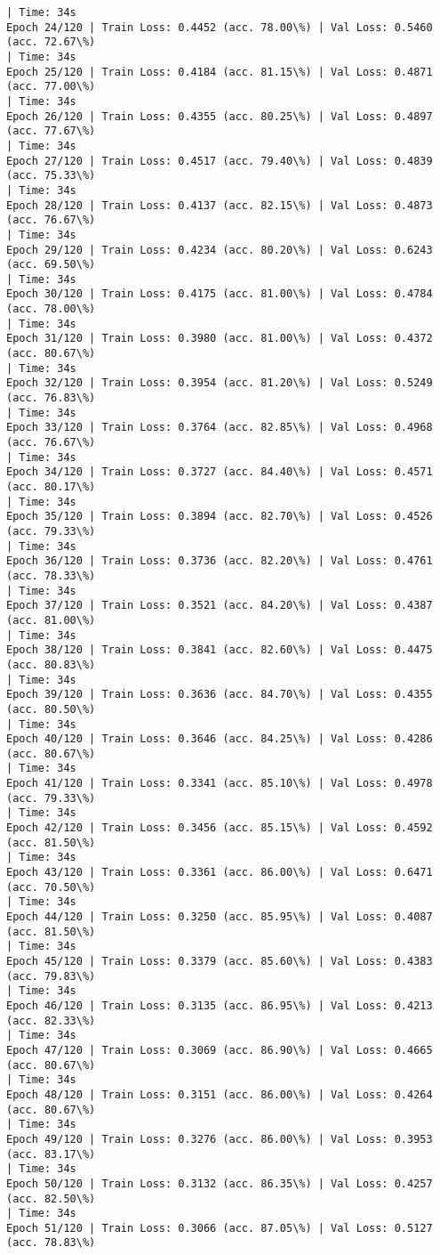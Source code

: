 \documentclass[8pt]{extarticle}
\begin{document}
\begin{Verbatim}[commandchars=\\\{\}]
| Time: 34s
Epoch 24/120 | Train Loss: 0.4452 (acc. 78.00\%) | Val Loss: 0.5460 (acc. 72.67\%)
| Time: 34s
Epoch 25/120 | Train Loss: 0.4184 (acc. 81.15\%) | Val Loss: 0.4871 (acc. 77.00\%)
| Time: 34s
Epoch 26/120 | Train Loss: 0.4355 (acc. 80.25\%) | Val Loss: 0.4897 (acc. 77.67\%)
| Time: 34s
Epoch 27/120 | Train Loss: 0.4517 (acc. 79.40\%) | Val Loss: 0.4839 (acc. 75.33\%)
| Time: 34s
Epoch 28/120 | Train Loss: 0.4137 (acc. 82.15\%) | Val Loss: 0.4873 (acc. 76.67\%)
| Time: 34s
Epoch 29/120 | Train Loss: 0.4234 (acc. 80.20\%) | Val Loss: 0.6243 (acc. 69.50\%)
| Time: 34s
Epoch 30/120 | Train Loss: 0.4175 (acc. 81.00\%) | Val Loss: 0.4784 (acc. 78.00\%)
| Time: 34s
Epoch 31/120 | Train Loss: 0.3980 (acc. 81.00\%) | Val Loss: 0.4372 (acc. 80.67\%)
| Time: 34s
Epoch 32/120 | Train Loss: 0.3954 (acc. 81.20\%) | Val Loss: 0.5249 (acc. 76.83\%)
| Time: 34s
Epoch 33/120 | Train Loss: 0.3764 (acc. 82.85\%) | Val Loss: 0.4968 (acc. 76.67\%)
| Time: 34s
Epoch 34/120 | Train Loss: 0.3727 (acc. 84.40\%) | Val Loss: 0.4571 (acc. 80.17\%)
| Time: 34s
Epoch 35/120 | Train Loss: 0.3894 (acc. 82.70\%) | Val Loss: 0.4526 (acc. 79.33\%)
| Time: 34s
Epoch 36/120 | Train Loss: 0.3736 (acc. 82.20\%) | Val Loss: 0.4761 (acc. 78.33\%)
| Time: 34s
Epoch 37/120 | Train Loss: 0.3521 (acc. 84.20\%) | Val Loss: 0.4387 (acc. 81.00\%)
| Time: 34s
Epoch 38/120 | Train Loss: 0.3841 (acc. 82.60\%) | Val Loss: 0.4475 (acc. 80.83\%)
| Time: 34s
Epoch 39/120 | Train Loss: 0.3636 (acc. 84.70\%) | Val Loss: 0.4355 (acc. 80.50\%)
| Time: 34s
Epoch 40/120 | Train Loss: 0.3646 (acc. 84.25\%) | Val Loss: 0.4286 (acc. 80.67\%)
| Time: 34s
Epoch 41/120 | Train Loss: 0.3341 (acc. 85.10\%) | Val Loss: 0.4978 (acc. 79.33\%)
| Time: 34s
Epoch 42/120 | Train Loss: 0.3456 (acc. 85.15\%) | Val Loss: 0.4592 (acc. 81.50\%)
| Time: 34s
Epoch 43/120 | Train Loss: 0.3361 (acc. 86.00\%) | Val Loss: 0.6471 (acc. 70.50\%)
| Time: 34s
Epoch 44/120 | Train Loss: 0.3250 (acc. 85.95\%) | Val Loss: 0.4087 (acc. 81.50\%)
| Time: 34s
Epoch 45/120 | Train Loss: 0.3379 (acc. 85.60\%) | Val Loss: 0.4383 (acc. 79.83\%)
| Time: 34s
Epoch 46/120 | Train Loss: 0.3135 (acc. 86.95\%) | Val Loss: 0.4213 (acc. 82.33\%)
| Time: 34s
Epoch 47/120 | Train Loss: 0.3069 (acc. 86.90\%) | Val Loss: 0.4665 (acc. 80.67\%)
| Time: 34s
Epoch 48/120 | Train Loss: 0.3151 (acc. 86.00\%) | Val Loss: 0.4264 (acc. 80.67\%)
| Time: 34s
Epoch 49/120 | Train Loss: 0.3276 (acc. 86.00\%) | Val Loss: 0.3953 (acc. 83.17\%)
| Time: 34s
Epoch 50/120 | Train Loss: 0.3132 (acc. 86.35\%) | Val Loss: 0.4257 (acc. 82.50\%)
| Time: 34s
Epoch 51/120 | Train Loss: 0.3066 (acc. 87.05\%) | Val Loss: 0.5127 (acc. 78.83\%)

\end{Verbatim}
\end{document}
